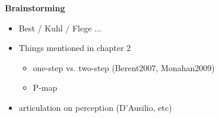 \textbf{Brainstorming} \\

\begin{itemize}
\item Best / Kuhl / Flege ...
\item Things mentioned in chapter 2
  \begin{itemize}
  \item one-step vs. two-step (Berent2007, Monahan2009)
  \item P-map
  \end{itemize}
\item articulation on perception (D'Ausilio, etc)
\end{itemize}

